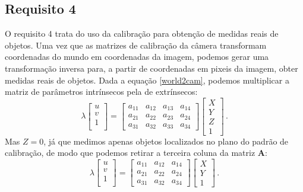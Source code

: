 \documentclass{bmvc2k}
\begin{document}
\subsection{Requisito 4}
O requisito 4 trata do uso da calibração para obtenção de medidas reais de objetos. Uma vez que as matrizes de calibração da câmera transformam coordenadas do mundo em coordenadas da imagem, podemos gerar uma transformação inversa para, a partir de coordenadas em pixeis da imagem, obter medidas reais de objetos. Dada a equação \ref{world2cam}, podemos multiplicar a matriz de parâmetros intrínsecos pela de extrínsecos:
\begin{equation}
    \lambda
    \begin{bmatrix}
    u \\
    v \\
    1 \\
    \end{bmatrix}
    =
    \begin{bmatrix}
    a_{11} & a_{12} & a_{13} & a_{14}  \\
    a_{21} & a_{22} & a_{23} & a_{24}  \\
    a_{31} & a_{32} & a_{33} & a_{34}
    \end{bmatrix}
    \begin{bmatrix}
    X \\
    Y \\
    Z \\
    1
    \end{bmatrix}\,.
\end{equation}
Mas $Z=0$, já que medimos apenas objetos localizados no plano do padrão de calibração, de modo que podemos retirar a terceira coluna da matriz \textbf{A}:
\begin{equation}
    \lambda
    \begin{bmatrix}
    u \\
    v \\
    1 \\
    \end{bmatrix}
    =
    \begin{bmatrix}
    a_{11} & a_{12}  & a_{14}  \\
    a_{21} & a_{22}  & a_{24}  \\
    a_{31} & a_{32}  & a_{34}
    \end{bmatrix}
    \begin{bmatrix}
    X \\
    Y \\
    1
    \end{bmatrix}\,.
\end{equation}
\end{document}
